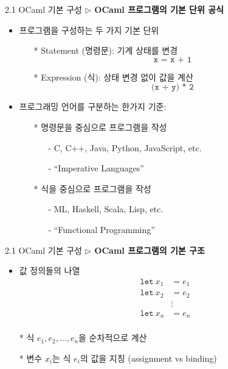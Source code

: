 \documentclass[10pt]{beamer}
\begin{document}
	\begin{frame}{2.1 OCaml 기본 구성}
		\textbf{$\triangleright$ OCaml 프로그램의 기본 단위 공식}
		
		\begin{itemize}
			\item 프로그램을 구성하는 두 가지 기본 단위
			\begin{itemize}
				\item[]
				\item[*] Statement (명령문): 기계 상태를 변경 \[
				\texttt{x = x + 1}
				\]
				\item[*] Expression (식): 상태 변경 없이 값을 계산 \[
				\texttt{(x + y) * 2}
				\]
			\end{itemize}
			\item 프로그래밍 언어를 구분하는 한가지 기준:
			\begin{itemize}
				\item[]
				\item[*] 명령문을 중심으로 프로그램을 작성
				\begin{itemize}
					\item[-] C, C++, Java, Python, JavaScript, etc.
					\item[-] ``Imperative Languages''
				\end{itemize}
				\item[]
				\item[*] 식을 중심으로 프로그램을 작성
				\begin{itemize}
					\item[-] ML, Haskell, Scala, Lisp, etc.
					\item[-] ``Functional Programming''
				\end{itemize}
			\end{itemize}
		\end{itemize}
	\end{frame}

	\begin{frame}{2.1 OCaml 기본 구성}
		\textbf{$\triangleright$ OCaml 프로그램의 기본 구조}
		
		\begin{itemize}
			\item 값 정의들의 나열 \begin{align*}
				\texttt{let}\ x_1 &= e_1\\
				\texttt{let}\ x_2 &= e_2\\
				&\vdots \\
				\texttt{let}\ x_n &= e_n\\
			\end{align*}
			\item[*] 식 $e_1,e_2,\dots,e_n$을 순차적으로 계산
			\item[]
			\item[*] 변수 $x_i$는 식 $e_i$의 값을 지칭 (assignment vs binding)
			\item[]
			\item[]
		\end{itemize}
	\end{frame}
\end{document}
